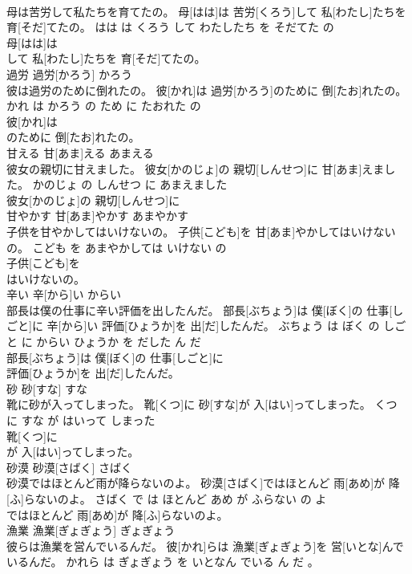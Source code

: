 \documentclass[8pt]{extreport}
\begin{document}
\begin{CJK}{UTF8}{min}
\\	母は苦労して私たちを育てたの。	母[はは]は 苦労[くろう]して 私[わたし]たちを 育[そだ]てたの。	はは は くろう して わたしたち を そだてた の	
\\	母[はは]は
\\	して 私[わたし]たちを 育[そだ]てたの。			
\\	過労	過労[かろう]	かろう	
\\	彼は過労のために倒れたの。	彼[かれ]は 過労[かろう]のために 倒[たお]れたの。	かれ は かろう の ため に たおれた の	
\\	彼[かれ]は
\\	のために 倒[たお]れたの。			
\\	甘える	甘[あま]える	あまえる	
\\	彼女の親切に甘えました。	彼女[かのじょ]の 親切[しんせつ]に 甘[あま]えました。	かのじょ の しんせつ に あまえました	
\\	彼女[かのじょ]の 親切[しんせつ]に
\\	甘やかす	甘[あま]やかす	あまやかす	
\\	子供を甘やかしてはいけないの。	子供[こども]を 甘[あま]やかしてはいけないの。	こども を あまやかしては いけない の	
\\	子供[こども]を
\\	はいけないの。			
\\	辛い	辛[から]い	からい	
\\	部長は僕の仕事に辛い評価を出したんだ。	部長[ぶちょう]は 僕[ぼく]の 仕事[しごと]に 辛[から]い 評価[ひょうか]を 出[だ]したんだ。	ぶちょう は ぼく の しごと に からい ひょうか を だした ん だ	
\\	部長[ぶちょう]は 僕[ぼく]の 仕事[しごと]に
\\	評価[ひょうか]を 出[だ]したんだ。			
\\	砂	砂[すな]	すな	
\\	靴に砂が入ってしまった。	靴[くつ]に 砂[すな]が 入[はい]ってしまった。	くつ に すな が はいって しまった	
\\	靴[くつ]に
\\	が 入[はい]ってしまった。			
\\	砂漠	砂漠[さばく]	さばく	
\\	砂漠ではほとんど雨が降らないのよ。	砂漠[さばく]ではほとんど 雨[あめ]が 降[ふ]らないのよ。	さばく で は ほとんど あめ が ふらない の よ	
\\	ではほとんど 雨[あめ]が 降[ふ]らないのよ。			
\\	漁業	漁業[ぎょぎょう]	ぎょぎょう	
\\	彼らは漁業を営んでいるんだ。	彼[かれ]らは 漁業[ぎょぎょう]を 営[いとな]んでいるんだ。	かれら は ぎょぎょう を いとなん でいる ん だ 。	

\end{CJK}
\end{document}
